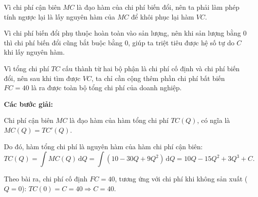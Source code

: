 \documentclass[12pt,a4paper,oneside]{book}
\theoremstyle{theorem}
\theoremstyle{definition}
\begin{document}
Vì chi phí cận biên $MC$ là đạo hàm của chi phí biến đổi, nên ta phải làm phép tính ngược lại là lấy nguyên hàm của $MC$ để khôi phục lại hàm $VC$.

Vì chi phí biến đổi phụ thuộc hoàn toàn vào sản lượng, nên khi sản lượng bằng 0 thì chi phí biến đổi cũng bắt buộc bằng 0, giúp ta triệt tiêu được hệ số tự do $C$ khi lấy nguyên hàm.

Vì tổng chi phí $TC$ cấu thành từ hai bộ phận là chi phí cố định và chi phí biến đổi, nên sau khi tìm được $VC$, ta chỉ cần cộng thêm phần chi phí bất biến $FC = 40$ là ra được toàn bộ tổng chi phí của doanh nghiệp.
\begin{center}
    \textbf{Các bước giải:}
\end{center}

Chi phí cận biên $MC$ là đạo hàm của hàm tổng chi phí $TC(Q)$, có ngĩa là $MC(Q) = TC'(Q)$.

Do đó, hàm tổng chi phí là nguyên hàm của hàm chi phí cận biên:
\[
TC(Q) = \int MC(Q) \, \mathrm{d}Q = \int (10 - 30Q + 9Q^2) \, \mathrm{d}Q = 10Q - 15Q^2 + 3Q^3 + C.
\]

 Theo bài ra, chi phí cố định $FC = 40$, tương ứng với chi phí khi không sản xuất ($Q = 0$):
$TC(0) = C = 40 \Rightarrow C = 40.$
\end{document}
